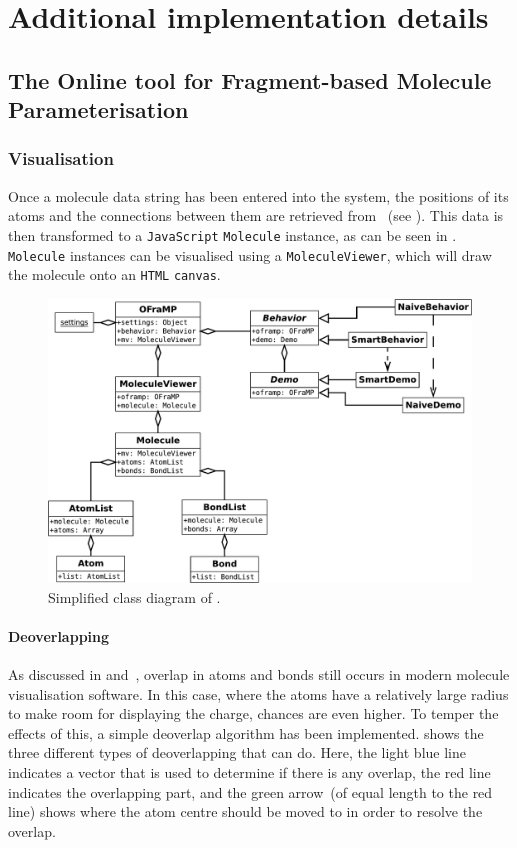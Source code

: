 \chapter[Additional implementation]{Additional implementation details}

\wip

\section[\oframp]{The Online tool for Fragment-based Molecule Parameterisation}
\subsection{Visualisation}
Once a molecule data string has been entered into the system, the positions of its atoms and the connections between them are retrieved from \oapoc~(see ). This data is then transformed to a \verb|JavaScript| \verb|Molecule| instance, as can be seen in . \verb|Molecule| instances can be visualised using a \verb|MoleculeViewer|, which will draw the molecule onto an \verb|HTML| \verb|canvas|.

\begin{figure}
\center
\includegraphics[width=\textwidth]{img/oframp_class.pdf}
\caption{Simplified class diagram of \oframp.}
\end{figure}

%

\subsubsection{Deoverlapping}
As discussed in  and~\cite{clark2006structure}, overlap in atoms and bonds still occurs in modern molecule visualisation software. In this case, where the atoms have a relatively large radius to make room for displaying the charge, chances are even higher. To temper the effects of this, a simple deoverlap algorithm has been implemented.  shows the three different types of deoverlapping that \oframp{} can do. Here, the light blue line indicates a vector that is used to determine if there is any overlap, the red line indicates the overlapping part, and the green arrow~(of equal length to the red line) shows where the atom centre should be moved to in order to resolve the overlap.

